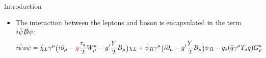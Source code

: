 \begin{frame}{Introduction}
    \vspace{0.05\textheight}
    \begin{itemize}
        \item The interaction between the leptons and \PW boson is encapsulated in the term $i\bar{\psi}\slashed{D}\psi$:
        \begin{equation*} \tiny
            i\bar{\psi}\slashed{D}\psi = 
            \bar{\chi}_L \gamma^\mu \big( i \partial_\mu  - \textcolor{red}{g} \frac{\tau_a}{2} W^a_\mu  -g'\frac{Y}{2} B_\mu \big) \chi_L 
            + \bar{\psi}_R \gamma^\mu \big( i \partial_\mu -g'\frac{Y}{2} B_\mu \big) \psi_R 
            - g_s (\bar{q}\gamma^\mu  T_{a} q) G_\mu^a 
        \end{equation*}
    \end{itemize}
\end{frame}



